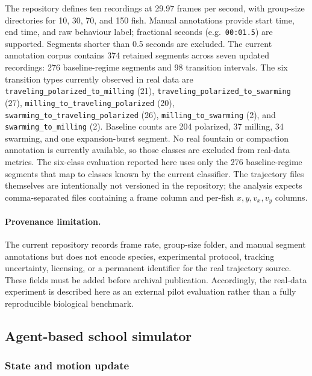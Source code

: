 \documentclass[11pt]{article}
\begin{document}
The repository defines ten recordings at 29.97 frames per second, with group-size directories for
10, 30, 70, and 150 fish. Manual annotations provide start time, end time, and raw behaviour label;
fractional seconds (e.g.\ \texttt{00:01.5}) are supported. Segments shorter than 0.5 seconds are
excluded. The current annotation corpus contains 374 retained segments across seven updated recordings:
276 baseline-regime segments and 98 transition intervals. The six transition types currently observed
in real data are \texttt{traveling\_polarized\_to\_milling} (21),
\texttt{traveling\_polarized\_to\_swarming} (27), \texttt{milling\_to\_traveling\_polarized} (20),
\texttt{swarming\_to\_traveling\_polarized} (26), \texttt{milling\_to\_swarming} (2), and
\texttt{swarming\_to\_milling} (2). Baseline counts are 204 polarized, 37 milling, 34 swarming, and
one expansion-burst segment. No real fountain or compaction annotation is currently available, so those
classes are excluded from real-data metrics. The six-class evaluation reported here uses only the 276
baseline-regime segments that map to classes known by the current classifier. The trajectory files
themselves are intentionally not versioned in the repository; the analysis expects comma-separated
files containing a frame column and per-fish \(x,y,v_x,v_y\) columns.

\paragraph{Provenance limitation.}
The current repository records frame rate, group-size folder, and manual segment annotations but does
not encode species, experimental protocol, tracking uncertainty, licensing, or a permanent identifier
for the real trajectory source. These fields must be added before archival publication. Accordingly,
the real-data experiment is described here as an external pilot evaluation rather than a fully
reproducible biological benchmark.

\subsection{Agent-based school simulator}

\subsubsection{State and motion update}
\end{document}
